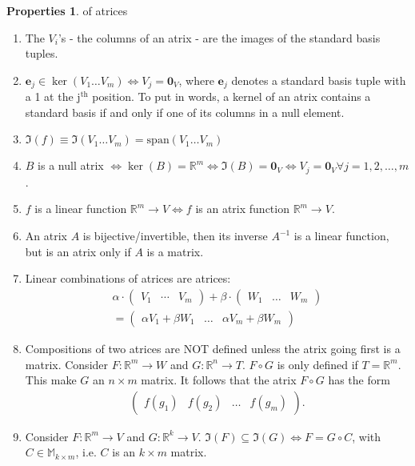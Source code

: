 \documentclass{book}
\theoremstyle{definition}
\newtheorem{prop}{Properties}[section]
\newcommand{\R}{\mathbb{R}}
\newcommand{\xpan}{\text{span}}
\begin{document}
\begin{prop} of atrices
	$\,$
	\begin{enumerate}
	\item The $V_i$'s - the columns of an atrix - are the images of the standard basis tuples. 
	\item $\mathbf{e}_j \in \ker(V_1\dots V_m) \iff V_j = \mathbf{0}_V$, where $\mathbf{e}_j$ denotes a standard basis tuple with a 1 at the j$^\text{th}$ position. To put in words, a kernel of an atrix contains a standard basis if and only if one of its columns in a null element. 
	\item $\Im(f) \equiv \Im(V_1\dots V_m) = \xpan(V_1\dots V_m)$
	\item $B$ is a null atrix $\iff \ker(B) = \R^m \iff \Im(B) = \mathbf{0}_V \iff V_j = \mathbf{0}_V \forall j=1,2,\dots,m$.
	\item  $f$ is a linear function $\R^m \rightarrow V \iff f$ is an atrix function $\R^m \rightarrow V$.
	\item An atrix $A$ is bijective/invertible, then its inverse $A^{-1}$ is a linear function, but is an atrix only if $A$ is a matrix. 
	\item Linear combinations of atrices are atrices:
	\begin{align*}
	\alpha \cdot\begin{pmatrix}
	V_1 & \cdots & V_m
	\end{pmatrix}
	+ 
	\beta \cdot \begin{pmatrix}
	W_1 & \dots & W_m
	\end{pmatrix}
	\\= \begin{pmatrix}
	\alpha V_1 + \beta W_1 &\dots& \alpha V_m + \beta W_m
	\end{pmatrix}
	\end{align*}  
	\item Compositions of two atrices are NOT defined unless the atrix going first is a matrix. Consider $F : \R^m \rightarrow W$ and $G : \R^n \rightarrow T$. $F\circ G$ is only defined if $T = \R^m$. This make $G$ an $n\times m$ matrix. It follows that the atrix $F\circ G$ has the form
	\begin{align*}
	\begin{pmatrix}
	f(g_1)&f(g_2)&\dots&f(g_m)
	\end{pmatrix}.
	\end{align*}
	\item Consider $F : \R^m \rightarrow V$ and $G : \R^k \rightarrow V$. $\Im(F) \subseteq \Im(G) \iff F = G \circ C$, with $C \in \mathbb{M}_{k\times m}$, i.e. $C$ is an $k \times m$ matrix. 

\end{enumerate}
\end{prop}
\end{document}
